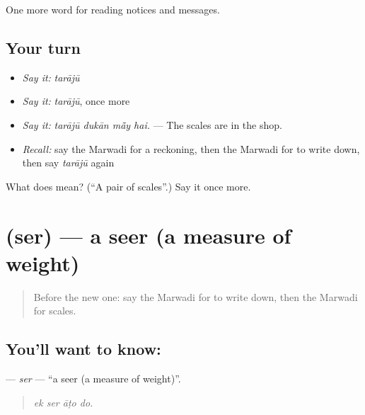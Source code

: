 \begin{grammarlens}[title={What you've built}]
One more word for reading notices and messages.
\end{grammarlens}

\subsection*{Your turn}
\begin{itemize}
\raggedright
  \item \emph{Say it:} \emph{tarājū}
  \item \emph{Say it:} \emph{tarājū}, once more
  \item \emph{Say it:} \emph{tarājū dukān mā̃y hai.} — The scales are in the shop.
  \item \emph{Recall:} say the Marwadi for a reckoning, then the Marwadi for to write down, then say \emph{tarājū} again
\end{itemize}

\begin{tcolorbox}[breakable,colback=teal!4,colframe=teal!35!black,title={Before you move on}]
What does  mean? (\textquotedblleft{}A pair of scales\textquotedblright{}.) Say it once more.
\end{tcolorbox}
\section[\texorpdfstring{\mw{सेर} (ser)}{सेर (ser)}]{ (ser) — a seer (a measure of weight)}

\label{lesson:MW-C200-ser}



\begin{quote}
Before the new one: say the Marwadi for to write down, then the Marwadi for scales.
\end{quote}

\subsection*{You'll want to know: }
\textbf{} — \emph{ser} — \textquotedblleft{}a seer (a measure of weight)\textquotedblright{}.

\begin{quote}
   
\end{quote}

\begin{quote}
\emph{ek ser āṭo do.}
\end{quote}

